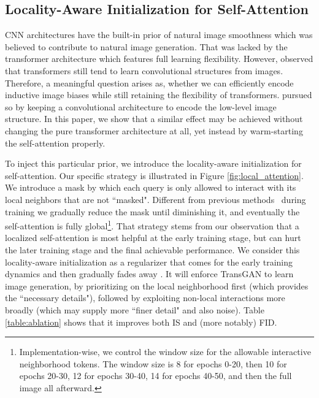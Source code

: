 \documentclass{article}
\begin{document}
\subsection{Locality-Aware Initialization for Self-Attention}



CNN architectures have the built-in prior of natural image smoothness \cite{Ulyanov_2018_CVPR} which was believed to contribute to natural image generation. That was lacked by the transformer architecture which features full learning flexibility. However, \cite{dosovitskiy2020image} observed that transformers still tend to learn convolutional structures from images. Therefore, a meaningful question arises as, whether we can efficiently encode inductive image biases while still retaining the flexibility of transformers. \cite{esser2020taming} pursued so by keeping a convolutional architecture to encode the low-level image structure. In this paper, we show that a similar effect may be achieved without changing the pure transformer architecture at all, yet instead by warm-starting the self-attention properly.




To inject this particular prior, we introduce the locality-aware initialization for self-attention. Our specific strategy is illustrated in Figure \ref{fig:local_attention}. We introduce a mask by which each query is only allowed to interact with its local neighbors that are not ``masked". Different from previous methods~\cite{daras2020your,parmar2018image,child2019generating,beltagy2020longformer} during training we gradually reduce the mask until diminishing it, and eventually the self-attention is fully global\footnote{Implementation-wise, we control the window size for the allowable interactive neighborhood tokens. The window size is 8 for epochs 0-20, then 10 for epochs 20-30, 12 for epochs 30-40, 14 for epochs 40-50, and then the full image all afterward.}.  That strategy stems from our observation that a localized self-attention \cite{parmar2018image} is most helpful at the early training stage, but can hurt the later training stage and the final achievable performance. We consider this locality-aware initialization as a regularizer that comes for the early training dynamics and then gradually fades away \cite{golatkar2019time}. It will enforce TransGAN to learn image generation, by prioritizing on the local neighborhood first (which provides the ``necessary details"), followed by exploiting non-local interactions more broadly (which may supply more ``finer detail" and also noise). Table \ref{table:ablation} shows that it improves both IS and (more notably) FID.  
\end{document}
